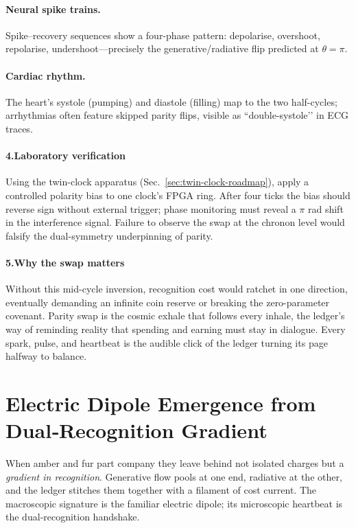\documentclass[11pt,oneside]{book}
\begin{document}
\paragraph*{Neural spike trains.}  
Spike–recovery sequences show a four-phase pattern: depolarise,
overshoot, repolarise, undershoot—precisely the generative/radiative
flip predicted at $\theta=\pi$.

\paragraph*{Cardiac rhythm.}  
The heart’s systole (pumping) and diastole (filling) map to the two
half-cycles; arrhythmias often feature skipped parity flips, visible as
“double-systole’’ in ECG traces.

\paragraph*{4.\;Laboratory verification}

Using the twin-clock apparatus
(Sec.~\ref{sec:twin-clock-roadmap}), apply a controlled polarity bias
to one clock’s FPGA ring.  
After four ticks the bias should reverse sign without external trigger;
phase monitoring must reveal a $\pi$ rad shift in the interference
signal.  
Failure to observe the swap at the chronon level would falsify the
dual-symmetry underpinning of parity.

\paragraph*{5.\;Why the swap matters}

Without this mid-cycle inversion, recognition cost would ratchet in one
direction, eventually demanding an infinite coin reserve or breaking the
zero-parameter covenant.  
Parity swap is the cosmic exhale that follows every inhale, the ledger’s
way of reminding reality that spending and earning must stay in
dialogue.  Every spark, pulse, and heartbeat is the audible click of the
ledger turning its page halfway to balance.

\section{Electric Dipole Emergence from Dual‑Recognition Gradient}
\label{sec:dipole-emergence}

When amber and fur part company they leave behind not isolated charges but a \emph{gradient in recognition}.  
Generative flow pools at one end, radiative at the other, and the ledger stitches them together with a filament of cost current.  
The macroscopic signature is the familiar electric dipole; its microscopic heartbeat is the dual‑recognition handshake.
\end{document}
